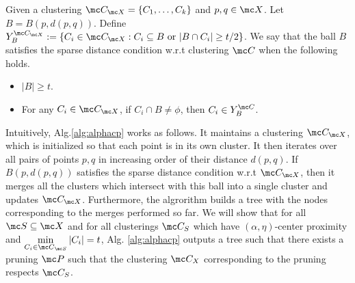 \documentclass[11pt]{article}
\begin{document}
\begin{definition}
	 Given a clustering $\mc C_{\mc X}=\{C_1,\ldots,C_k\}$ and $p, q \in \mc X$. Let $B = B(p, d(p, q))$. Define $Y_B^{\mc C_{\mc X}} := \{C_i \in \mc C_{\mc X} : C_i \subseteq B \text{ or } |B \cap C_i| \ge t/2\}$. 
We say that the ball $B$ satisfies the sparse distance condition w.r.t clustering $\mc C$ when the following holds.
\begin{itemize}[noitemsep, leftmargin=*]
\item $|B| \ge t$.
\item For any $C_i \in \mc C_{\mc X}$, if $C_i \cap B \neq \phi$, then $C_i \in Y_B^{\mc C}$.
\end{itemize}
\end{definition}

Intuitively, Alg.\ref{alg:alphacp} works as follows. It maintains a clustering $\mc C_{\mc X}$, which is initialized so that  each point is in its own cluster. It then iterates over all pairs of points $p, q$ in increasing order of their distance $d(p, q)$. If $B(p, d(p,q))$ satisfies the sparse distance condition w.r.t $\mc C_{\mc X}$, then it merges all the clusters which intersect with this ball into a single cluster and updates $\mc C_{\mc X}$. Furthermore, the algrorithm builds a tree with the nodes corresponding to the merges performed so far. We will show that for all $\mc S \subseteq \mc X$ and for all clusterings $\mc C_S$ which have $(\alpha, \eta)$-center proximity and $\min\limits_{C_i \in {\mc C}_{\mc S}} |C_i| = t$, Alg. \ref{alg:alphacp} outputs a tree such that there exists a pruning $\mc P$ such that the clustering $\mc C_X$ corresponding to the pruning respects $\mc C_S$. %
\end{document}
